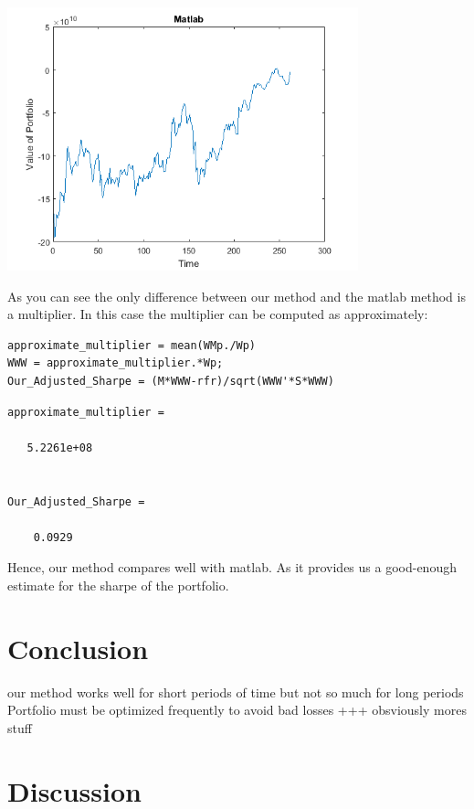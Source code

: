 \documentclass[12pt,titlepage,a4paper]{article}
\begin{document}
\includegraphics [width=4in]{testing_02.png}
\begin{par}
As you can see the only difference between our method and the matlab method is a multiplier. In this case the multiplier can be computed as approximately:
\end{par} \vspace{1em}
\begin{verbatim}
approximate_multiplier = mean(WMp./Wp)
WWW = approximate_multiplier.*Wp;
Our_Adjusted_Sharpe = (M*WWW-rfr)/sqrt(WWW'*S*WWW)
\end{verbatim}

        \color{lightgray} \begin{verbatim}
approximate_multiplier =

   5.2261e+08


Our_Adjusted_Sharpe =

    0.0929

\end{verbatim} \color{black}
    \begin{par}
Hence, our method compares well with matlab. As it provides us a good-enough estimate for the sharpe of the portfolio.
\end{par} \vspace{1em}
\section{Conclusion}
our method works well for short periods of time but not so much for long periods
Portfolio must be optimized frequently to avoid bad losses +++ obsviously mores stuff\\

\section{Discussion}
\end{document}
